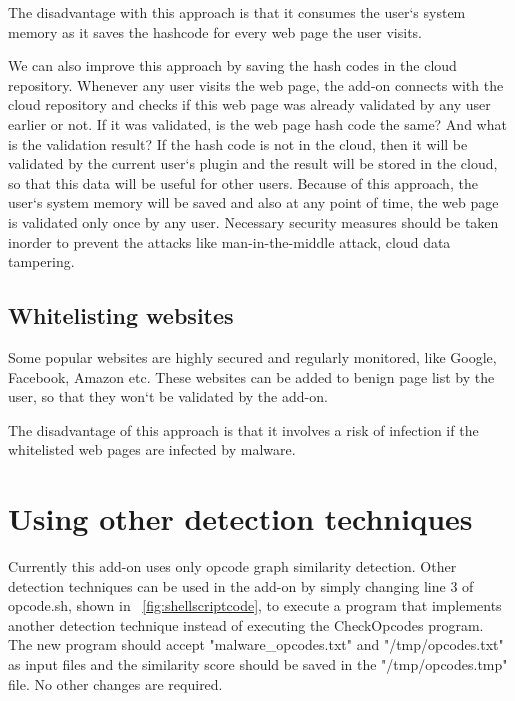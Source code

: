 The disadvantage with this approach is that it consumes the user`s system memory as it saves the hashcode for every web page the user visits. 

We can also improve this approach by saving the hash codes in the cloud repository. Whenever any user visits the web page, the add-on connects with the cloud repository and checks if this web page was already validated by any user earlier or not. If it was validated, is the web page hash code the same? And what is the validation result? If the hash code is not in the cloud, then it will be validated by the current user`s plugin and the result will be stored in the cloud, so that this data will be useful for other users. Because of this approach, the user`s system memory will be saved and also at any point of time, the web page is validated only once by any user. Necessary security measures should be taken inorder to prevent the attacks like man-in-the-middle attack, cloud data tampering. 
 
\subsection{Whitelisting websites} 
Some popular websites are highly secured and regularly monitored, like Google, Facebook, Amazon etc. These websites can be added to benign page list by the user, so that they won`t be validated by the add-on.

The disadvantage of this approach is that it involves a risk of infection if the whitelisted web pages are infected by malware.

\section{Using other detection techniques} 
Currently this add-on uses only opcode graph similarity detection. Other detection techniques can be used in the add-on by simply changing line 3 of opcode.sh, shown in ~\ref{fig:shellscriptcode}, to execute a program that implements another detection technique instead of executing the CheckOpcodes program. The new program should accept "malware\_opcodes.txt" and "/tmp/opcodes.txt" as input files and the similarity score should be saved in the "/tmp/opcodes.tmp" file. No other changes are required. 